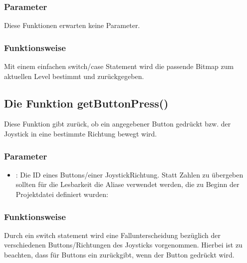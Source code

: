 \documentclass[letterpaper,10pt,ngerman]{sphinxmanual}
\begin{document}
\subsubsection{Parameter}
\label{\detokenize{programming:id1}}
Diese Funktionen erwarten keine Parameter.


\subsubsection{Funktionsweise}
\label{\detokenize{programming:id2}}
Mit einem einfachen switch/case Statement wird die passende Bitmap zum
aktuellen Level bestimmt und zurückgegeben.


\subsection{Die Funktion getButtonPress()}
\label{\detokenize{programming:die-funktion-getbuttonpress}}
Diese Funktion gibt zurück, ob ein angegebener Button gedrückt bzw. der
Joystick in eine bestimmte Richtung bewegt wird.


\subsubsection{Parameter}
\label{\detokenize{programming:id3}}\begin{itemize}
\item {} 
: Die ID eines Buttons/einer Joystick\sphinxhyphen{}Richtung. Statt Zahlen zu
übergeben sollten für die Lesbarkeit die Aliase verwendet werden, die zu
Beginn der Projektdatei definiert wurden:

\begin{sphinxVerbatim}[commandchars=\\\{\}]
\end{sphinxVerbatim}

\end{itemize}


\subsubsection{Funktionsweise}
\label{\detokenize{programming:id4}}
Durch ein switch statement wird eine Fallunterscheidung bezüglich der
verschiedenen Buttons/Richtungen des Joysticks vorgenommen. Hierbei ist zu
beachten, dass für Buttons ein   zurückgibt, wenn
der Button  gedrückt wird.
\end{document}
